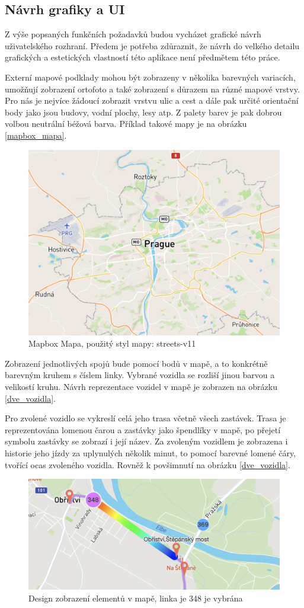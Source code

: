 \subsection{Návrh grafiky a UI}


Z výše popsaných funkčních požadavků budou vycházet grafické návrh uživatelského rozhraní. Předem je potřeba zdůraznit, že návrh do velkého detailu grafických a estetických vlastností této aplikace není předmětem této práce.


\bigbreak


Externí mapové podklady mohou být zobrazeny v několika barevných variacích, umožňují zobrazení ortofoto a také zobrazení s důrazem na různé mapové vrstvy. Pro nás je nejvíce žádoucí zobrazit vrstvu ulic a cest a dále pak určité orientační body jako jsou budovy, vodní plochy, lesy atp. Z palety barev je pak dobrou volbou neutrální béžová barva. Příklad takové mapy je na obrázku \ref{mapbox_mapa}.


\begin{figure}
\centering
  \includegraphics[width=0.5\linewidth]{../img/mapa_mapbox.png}
  \caption{Mapbox Mapa, použitý styl mapy: streets-v11}
  \label{fig:mapbox_mapa}
\end{figure}


Zobrazení jednotlivých spojů bude pomocí bodů v mapě, a to konkrétně barevným kruhem s číslem linky. Vybrané vozidla se rozliší jinou barvou a velikostí kruhu. Návrh reprezentace vozidel v mapě je zobrazen na obrázku \ref{dve_vozidla}.


\bigbreak


Pro zvolené vozidlo se vykreslí celá jeho trasa včetně všech zastávek. Trasa je reprezentována lomenou čarou a zastávky jako špendlíky v mapě, po přejetí symbolu zastávky se zobrazí i její název. Za zvoleným vozidlem je zobrazena i historie jeho jízdy za uplynulých několik minut, to pomocí barevné lomené čáry, tvořící ocas zvoleného vozidla. Rovněž k povšimnutí na obrázku \ref{dve_vozidla}.


\begin{figure}
\centering
  \includegraphics[width=0.5\linewidth]{../img/dve_vozidla.png}
  \caption{Design zobrazení elementů v mapě, linka je 348 je vybrána}
  \label{fig:dve_vozidla}
\end{figure}


